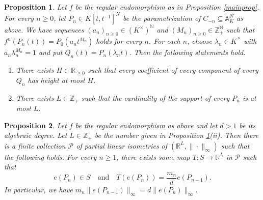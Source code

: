 \documentclass[10pt,a4paper]{amsart}
\newtheorem{proposition}{Proposition}
\begin{document}
\begin{proposition}\label{bdhtsup}
Let $f$ be the regular endomorphism as in Proposition \ref{mainprop}. For every $n\geq0$, let $P_n\in K[t,t^{-1}]^N$ be the parametrization of $C_{-n}\subseteq\mathbb{A}_K^N$ as above. We have sequences $(a_n)_{n\geq0}\in(K^{\times})^{\mathbb{N}}$ and $(M_n)_{n\geq0}\in\mathbb{Z}_+^{\mathbb{N}}$ such that $f^n(P_n(t))=P_0(a_nt^{M_n})$ holds for every $n$. For each $n$, choose $\lambda_n\in\overline{K}^{\times}$ with $a_n\lambda_n^{M_n}=1$ and put $Q_n(t)=P_n(\lambda_nt)$. Then the following statements hold.
\begin{enumerate}
\item
There exists $H\in\mathbb{R}_{\geq0}$ such that every coefficient of every component of every $Q_n$ has height at most $H$.
\item
There exists $L\in\mathbb{Z}_+$ such that the cardinality of the support of every $P_n$ is at most $L$.
\end{enumerate}
\end{proposition}

\begin{proposition}\label{supevolve}
Let $f$ be the regular endomorphism as above and let $d>1$ be its algebraic degree. Let $L\in\mathbb{Z}_+$ be the number given in Proposition \ref{bdhtsup}(ii). Then there is a finite collection $\mathcal{P}$ of partial linear isometries of $(\mathbb{R}^L,\|\cdot\|_{\infty})$ such that the following holds. For every $n\geq1$, there exists some map $T\colon S\to\mathbb{R}^L$ in $\mathcal{P}$ such that
$$
e(P_n)\in S\quad\text{and}\quad T(e(P_n))=\frac{m_n}{d}e(P_{n-1}).
$$
In particular, we have $m_n\|e(P_{n-1})\|_{\infty}=d\|e(P_n)\|_{\infty}$.
\end{proposition}
\end{document}
